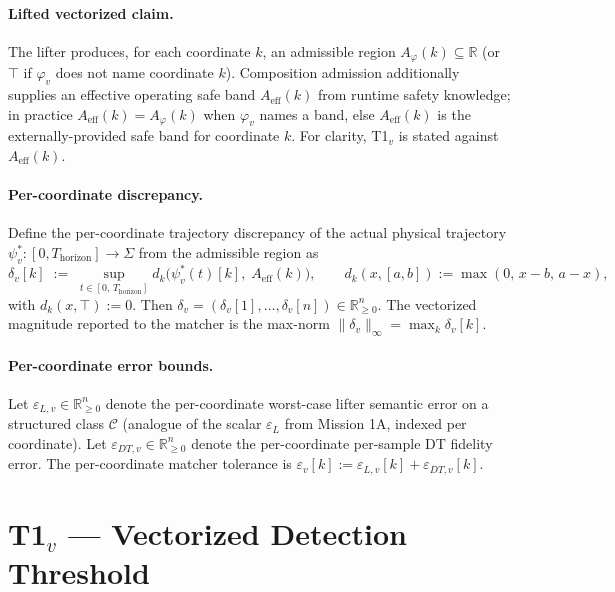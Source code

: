\documentclass[11pt]{article}
\begin{document}
\paragraph{Lifted vectorized claim.}
The lifter produces, for each coordinate $k$, an admissible region
$A_\varphi(k) \subseteq \mathbb{R}$ (or $\top$ if $\varphi_v$ does not name
coordinate $k$). Composition admission additionally supplies an effective
operating safe band $A_{\text{eff}}(k)$ from runtime safety knowledge; in
practice $A_{\text{eff}}(k) = A_\varphi(k)$ when $\varphi_v$ names a band,
else $A_{\text{eff}}(k)$ is the externally-provided safe band for coordinate
$k$. For clarity, T1${}_v$ is stated against $A_{\text{eff}}(k)$.

\paragraph{Per-coordinate discrepancy.}
Define the per-coordinate trajectory discrepancy of the actual physical
trajectory $\psi_v^{*}: [0, T_{\text{horizon}}] \to \Sigma$ from the
admissible region as
\[
\delta_v[k] \;:=\;
   \sup_{t \in [0,\, T_{\text{horizon}}]}
   d_k\!\bigl( \psi_v^{*}(t)[k],\; A_{\text{eff}}(k)\bigr),
\qquad
d_k(x, [a,b]) := \max(0,\, x - b,\, a - x),
\]
with $d_k(x, \top) := 0$. Then
$\delta_v = (\delta_v[1], \dots, \delta_v[n]) \in \mathbb{R}_{\geq 0}^{n}$.
The vectorized magnitude reported to the matcher is the max-norm
$\|\delta_v\|_\infty = \max_k \delta_v[k]$.

\paragraph{Per-coordinate error bounds.}
Let $\varepsilon_{L,v} \in \mathbb{R}_{\geq 0}^{n}$ denote the
per-coordinate worst-case lifter semantic error on a structured class
$\mathcal{C}$ (analogue of the scalar $\varepsilon_L$ from Mission 1A,
indexed per coordinate). Let $\varepsilon_{DT,v} \in \mathbb{R}_{\geq 0}^{n}$
denote the per-coordinate per-sample DT fidelity error. The per-coordinate
matcher tolerance is $\varepsilon_v[k] := \varepsilon_{L,v}[k] + \varepsilon_{DT,v}[k]$.

\section{T1${}_v$ --- Vectorized Detection Threshold}
\label{sec:t1v}
\end{document}
